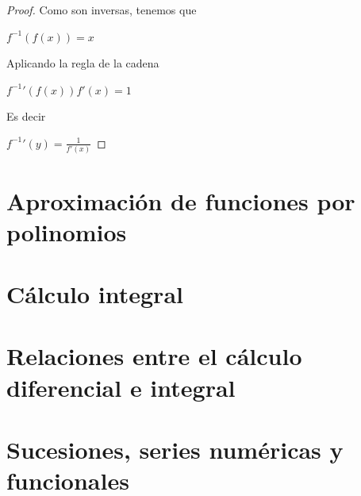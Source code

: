 \begin{proof}


Como son inversas, tenemos que

$f^{-1}(f(x)) = x$

Aplicando la regla de la cadena

$f^{-1}'(f(x)) f'(x) = 1$

Es decir

$f^{-1}'(y) = \frac{1}{f'(x)}$
\end{proof}



\chapter{Aproximación de funciones por polinomios}


\chapter{Cálculo integral}

\chapter{Relaciones entre el cálculo diferencial e integral}

\chapter{Sucesiones, series numéricas y funcionales}



